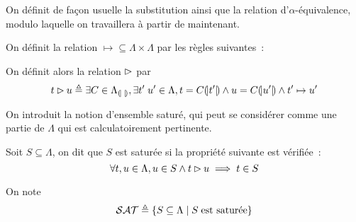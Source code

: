 \documentclass{article}
\begin{document}
On définit de façon usuelle la substitution ainsi que la relation d'$\alpha$-équivalence, modulo laquelle on travaillera à partir de maintenant.

\begin{defi}[Réduction]
  On définit la relation $\mapsto\subseteq \Lambda\times\Lambda$ par les règles suivantes~:
  \begin{center}
    \begin{prooftree}
    \end{prooftree}
    \quad
    \begin{prooftree}
    \end{prooftree}
    \quad
    \begin{prooftree}
    \end{prooftree}
    \quad
    \begin{prooftree}
    \end{prooftree}

    \vspace{0.5cm}
    
    \begin{prooftree}
    \end{prooftree}
    \quad
    \begin{prooftree}
    \end{prooftree}
    \quad
    \begin{prooftree}
    \end{prooftree}
    \quad
    \begin{prooftree}
    \end{prooftree}
  \end{center}

  On définit alors la relation $\reduc$ par
  \[t\reduc u \defeq \exists C \in\Lambda_{\bnnbr{\;}},\exists t'\;u'\in\Lambda, t = C\bnnbr{t'}\land u = C\bnnbr{u'}\land t' \mapsto u'\]
\end{defi}

On introduit la notion d'ensemble saturé, qui peut se considérer comme une partie de $\Lambda$ qui est calculatoirement pertinente.

\begin{defi}
  Soit $S\subseteq\Lambda$, on dit que $S$ est saturée si la propriété suivante est vérifiée~:
  \[\forall t,u\in\Lambda, u \in S \land t \reduc u \implies t \in S\]

  On note
  \[\SAT \defeq \{S\subseteq \Lambda\mid S\;\text{est saturée}\}\]
\end{defi}
\end{document}
